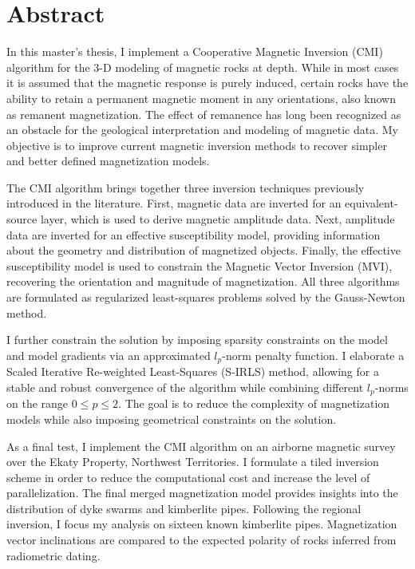 
\chapter{Abstract}
In this master's thesis, I implement a Cooperative Magnetic Inversion (CMI) algorithm for the 3-D modeling of magnetic rocks at depth.
While in most cases it is assumed that the magnetic response is purely induced, certain rocks have the ability to retain a permanent magnetic moment in any orientations, also known as remanent magnetization.
The effect of remanence has long been recognized as an obstacle for the geological interpretation and modeling of magnetic data.
My objective is to improve current magnetic inversion methods to recover simpler and better defined magnetization models.

The CMI algorithm brings together three inversion techniques previously introduced in the literature.
First, magnetic data are inverted for an equivalent-source layer, which is used to derive magnetic amplitude data.
Next, amplitude data are inverted for an effective susceptibility model, providing information about the geometry and distribution of magnetized objects.
Finally, the effective susceptibility model is used to constrain the Magnetic Vector Inversion (MVI), recovering the orientation and magnitude of magnetization.
All three algorithms are formulated as regularized least-squares problems solved by the Gauss-Newton method.

I further constrain the solution by imposing sparsity constraints on the model and model gradients via an approximated $l_p$-norm penalty function. I elaborate a Scaled Iterative Re-weighted Least-Squares (S-IRLS) method, allowing for a stable and robust convergence of the algorithm while combining different $l_p$-norms on the range $0 \leq p \leq 2$.
The goal is to reduce the complexity of magnetization models while also imposing geometrical constraints on the solution.

As a final test, I implement the CMI algorithm on an airborne magnetic survey over the Ekaty Property, Northwest Territories.
I formulate a tiled inversion scheme in order to reduce the computational cost and increase the level of parallelization.
The final merged magnetization model provides insights into the distribution of dyke swarms and kimberlite pipes.
Following the regional inversion, I focus my analysis on sixteen known kimberlite pipes.
Magnetization vector inclinations are compared to the expected polarity of rocks inferred from radiometric dating. 

